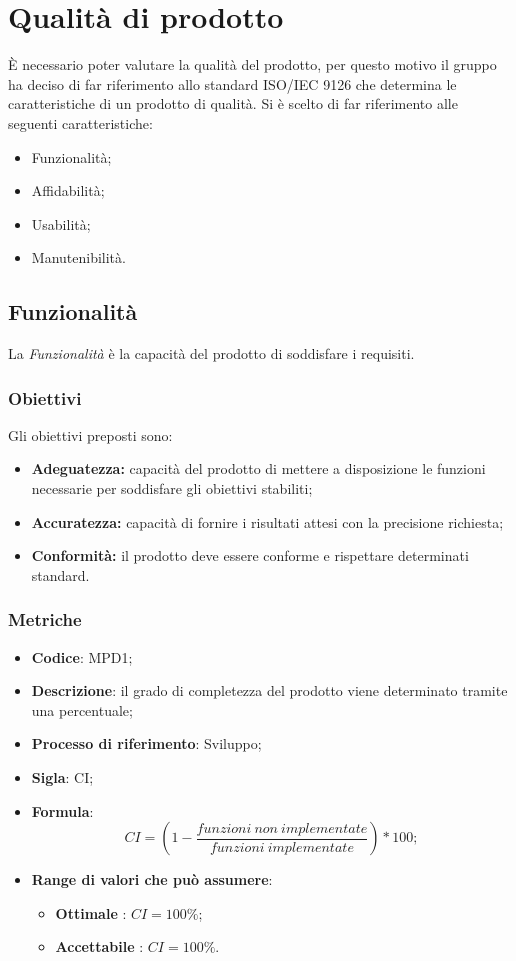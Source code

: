 \section{Qualità di prodotto}
È necessario poter valutare la qualità del prodotto, per questo motivo il gruppo \Omicron{} ha deciso di far riferimento allo standard ISO/IEC 9126 che determina le caratteristiche di un prodotto di qualità. Si è scelto di far riferimento alle seguenti caratteristiche:
\begin {itemize}
	\item{Funzionalità;}
	\item{Affidabilità;}
	\item{Usabilità;}
	\item{Manutenibilità.}
\end{itemize}

\subsection{Funzionalità}
La \textit{Funzionalità} è la capacità del prodotto di soddisfare i requisiti.
\subsubsection{Obiettivi}
Gli obiettivi preposti sono:
\begin {itemize}
	\item \textbf{Adeguatezza:} capacità del prodotto di mettere a disposizione le funzioni necessarie per soddisfare gli obiettivi stabiliti;
	\item \textbf{Accuratezza:} capacità di fornire i risultati attesi con la precisione richiesta;
	\item \textbf{Conformità:} il prodotto deve essere conforme e rispettare determinati standard.
\end{itemize}
\subsubsection{Metriche}
\vspace{-1cm}
\begin{itemize}
	\item \textbf{Codice}: MPD1;
	\item \textbf{Descrizione}: il grado di completezza del prodotto viene determinato tramite una percentuale;
	\item \textbf{Processo di riferimento}: Sviluppo;
	\item \textbf{Sigla}: CI;
	\item \textbf{Formula}: \[CI=\left(1-\frac{funzioni \ non \ implementate}{funzioni \ implementate}\right)\ast100;\]
	\item \textbf{Range di valori che può assumere}: 
		\begin{itemize}
			\item \textbf{Ottimale} : $CI = 100 \%$;
			\item \textbf{Accettabile} : $CI = 100 \%$.
		\end{itemize}
\end{itemize}

